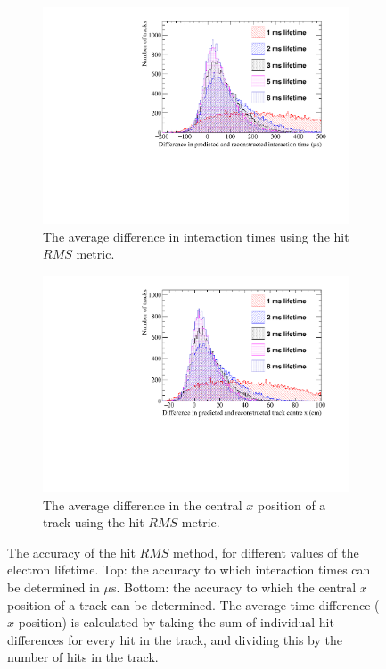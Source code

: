 \begin{figure}
  \centering
  \begin{subfigure}{0.6\textwidth}
    \centering
    \includegraphics[width=\textwidth]{Canvas_AvDiff_T_RMS_ElecLifetime}
    \caption{The average difference in interaction times using the hit $RMS$ metric.}
    \label{fig:DiffLifeStudy_AvDiffRMS_T}
  \end{subfigure}
  \begin{subfigure}{0.6\textwidth}
    \centering
    \includegraphics[width=\textwidth]{Canvas_AvDiff_X_RMS_ElecLifetime}
    \caption{The average difference in the central $x$ position of a track using the hit $RMS$ metric.}
    \label{fig:DiffLifeStudy_AvDiffRMS_X}
  \end{subfigure}
  \caption[Comparing the accuracy of the hit $RMS$ method, as the electron lifetime changes]
          {The accuracy of the hit $RMS$ method, for different values of the electron lifetime. Top: the accuracy to which interaction times can be determined in $\mu$s. Bottom: the accuracy to which the central $x$ position of a track can be determined. The average time difference ($x$ position) is calculated by taking the sum of individual hit differences for every hit in the track, and dividing this by the number of hits in the track.}
  \label{fig:DiffLifeStudy_AvDiff_RMS}
\end{figure}

